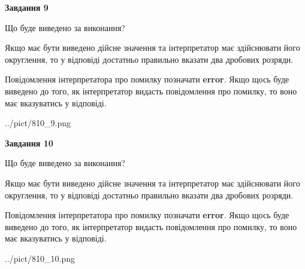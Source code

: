 \documentclass[12pt, ukrainian]{article}
\begin{document}
{\begin {Large}
{\begin {center}\textbf{Завдання 9}\end {center}}\par
Що буде виведено за виконання? \par

Якщо має бути виведено дійсне значення та інтерпретатор має здійснювати його округлення, 
то у відповіді достатньо правильно вказати два дробових розряди.

Повідомлення інтерпретатора про помилку позначати \textbf{error}.
Якщо щось буде виведено до того, як інтерпретатор видасть повідомлення про помилку, 
то воно має вказуватись у відповіді. \par

\begin{center}
	{../pict/810_9.png}
\end{center}
\newpage

{\begin {center}\textbf{Завдання 10}\end {center}}\par
Що буде виведено за виконання? \par

Якщо має бути виведено дійсне значення та інтерпретатор має здійснювати його округлення, 
то у відповіді достатньо правильно вказати два дробових розряди.

Повідомлення інтерпретатора про помилку позначати \textbf{error}.
Якщо щось буде виведено до того, як інтерпретатор видасть повідомлення про помилку, 
то воно має вказуватись у відповіді. \par

\begin{center}
	{../pict/810_10.png}
\end{center}
\newpage

\end {Large}}
\end{document}
